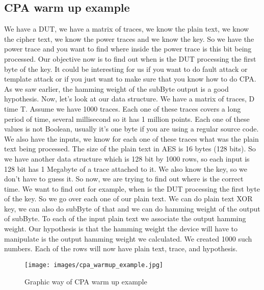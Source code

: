 \subsection{CPA warm up example}\label{c8_CPA_warm_up_example:subsec}
We have a DUT, we have a matrix of traces, we know the plain text, we know the cipher text, we know the power traces and we know the key. So we have the power trace and you want to find where inside the power trace is this bit being processed. Our objective now is to find out when is the DUT processing the first byte of the key. It could be interesting for us if you want to do fault attack or template attack or if you just want to make sure that you know how to do CPA. As we saw earlier, the hamming weight of the subByte output is a good hypothesis.
Now, let’s look at our data structure. We have a matrix of traces, D time T. Assume we have 1000 traces. Each one of these traces covers a long period of time, several millisecond so it has 1 million points. Each one of these values is not Boolean, usually it’s one byte if you are using a regular source code. We also have the inputs, we know for each one of these traces what was the plain text being processed. The size of the plain text in AES is 16 bytes (128 bits). So we have another data structure which is 128 bit by 1000 rows, so each input is 128 bit has 1 Megabyte of a trace attached to it. We also know the key, so we don’t have to guess it. So now, we are trying to find out where is the correct time. We want to find out for example, when is the DUT processing the first byte of the key. So we go over each one of our plain text. We can do plain text XOR key, we can also do subByte of that and we can do hamming weight of the output of subByte. To each of the input plain text we associate the output hamming weight. Our hypothesis is that the hamming weight the device will have to manipulate is the output hamming weight we calculated. We created 1000 such numbers. Each of the rows will now have plain text, trace, and hypothesis.
\begin{figure}[H]
    \centering
    \texttt{[image: images/cpa\_warmup\_example.jpg]}
    \caption{Graphic way of CPA warm up example} \label{c8_cpa_warmup_example:fig}
\end{figure}
